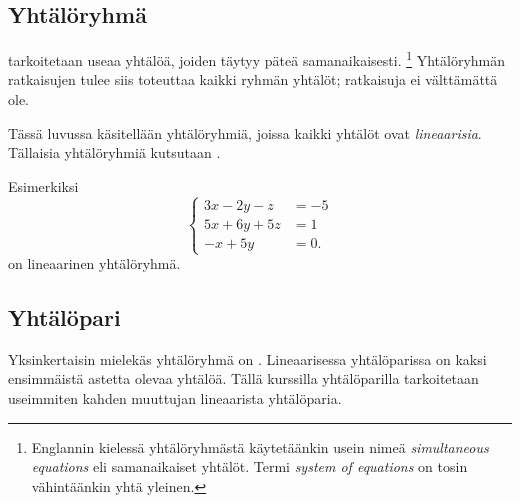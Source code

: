 
\subsection*{Yhtälöryhmä}

 tarkoitetaan useaa yhtälöä, joiden täytyy
päteä samanaikaisesti. \footnote{Englannin kielessä yhtälöryhmästä käytetäänkin usein nimeä 
  \emph{simultaneous equations} eli samanaikaiset yhtälöt.
  Termi \emph{system of equations} on tosin vähintäänkin yhtä yleinen.}
Yhtälöryhmän ratkaisujen tulee siis toteuttaa kaikki ryhmän yhtälöt; ratkaisuja ei välttämättä ole.

Tässä luvussa käsitellään yhtälöryhmiä, joissa kaikki yhtälöt ovat \emph{lineaarisia}. 
Tällaisia yhtälöryhmiä kutsutaan .

Esimerkiksi
\[
\left\{
\begin{aligned}
3x-2y-z&= -5 \\
5x+6y+5z&= 1 \\
-x+5y&= 0.
\end{aligned}
\right.
\]
on lineaarinen yhtälöryhmä. 


\subsection*{Yhtälöpari}

Yksinkertaisin mielekäs yhtälöryhmä on . Lineaarisessa yhtälöparissa on kaksi ensimmäistä astetta olevaa yhtälöä. Tällä kurssilla yhtälöparilla tarkoitetaan useimmiten kahden muuttujan lineaarista yhtälöparia.

